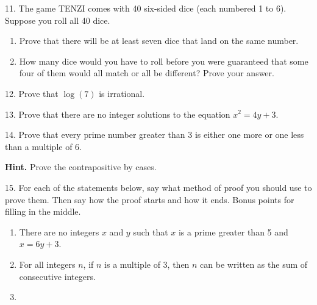 \documentclass[10pt,]{book}
\theoremstyle{plain}
\theoremstyle{definition}
\theoremstyle{definition}
\theoremstyle{definition}
\theoremstyle{definition}
\numberwithin{equation}{chapter}
\begin{document}
\begin{exerciselist}
\par\smallskip
\item[11.]\hypertarget{exercise-161}{}\hypertarget{p-1426}{}%
The game TENZI comes with 40 six-sided dice (each numbered 1 to 6). Suppose you roll all 40 dice. \leavevmode%
\begin{enumerate}[label=(\alph*)]
\item\hypertarget{li-670}{}Prove that there will be at least seven dice that land on the same number.%
\item\hypertarget{li-671}{}\hypertarget{p-1427}{}%
How many dice would you have to roll before you were guaranteed that some four of them would all match or all be different? Prove your answer.%
\end{enumerate}
%
\par\smallskip
\item[12.]\hypertarget{exercise-162}{}\hypertarget{p-1433}{}%
Prove that \(\log(7)\) is irrational.%
\par\smallskip
\item[13.]\hypertarget{exercise-163}{}\hypertarget{p-1438}{}%
Prove that there are no integer solutions to the equation \(x^2 = 4y + 3\).%
\par\smallskip
\item[14.]\hypertarget{exercise-164}{}\hypertarget{p-1439}{}%
Prove that every prime number greater than 3 is either one more or one less than a multiple of 6.%
\par\smallskip
\par\smallskip%
\noindent\textbf{Hint.}\hypertarget{hint-10}{}\quad%
\hypertarget{p-1440}{}%
Prove the contrapositive by cases.%
\item[15.]\hypertarget{exercise-165}{}\hypertarget{p-1441}{}%
For each of the statements below, say what method of proof you should use to prove them. Then say how the proof starts and how it ends. Bonus points for filling in the middle.%
\par
\hypertarget{p-1442}{}%
\leavevmode%
\begin{enumerate}[label=(\alph*)]
\item\hypertarget{li-674}{}\hypertarget{p-1443}{}%
There are no integers \(x\) and \(y\) such that \(x\) is a prime greater than 5 and \(x = 6y + 3\).%
\item\hypertarget{li-675}{}\hypertarget{p-1444}{}%
For all integers \(n\), if \(n\) is a multiple of 3, then \(n\) can be written as the sum of consecutive integers.%
\item\hypertarget{li-676}{}\hypertarget{p-1445}{}%

\end{enumerate}
\end{exerciselist}
\end{document}
